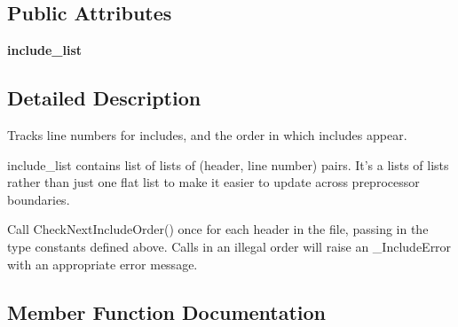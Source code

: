 \subsection*{Public Attributes}
\begin{DoxyCompactItemize}
\item 
{\bfseries include\+\_\+list}\hypertarget{classcpplint_1_1__IncludeState_a82d8b92a431437ee181e950517c71cbb}{}\label{classcpplint_1_1__IncludeState_a82d8b92a431437ee181e950517c71cbb}

\end{DoxyCompactItemize}


\subsection{Detailed Description}
\begin{DoxyVerb}Tracks line numbers for includes, and the order in which includes appear.

include_list contains list of lists of (header, line number) pairs.
It's a lists of lists rather than just one flat list to make it
easier to update across preprocessor boundaries.

Call CheckNextIncludeOrder() once for each header in the file, passing
in the type constants defined above. Calls in an illegal order will
raise an _IncludeError with an appropriate error message.\end{DoxyVerb}
 

\subsection{Member Function Documentation}
